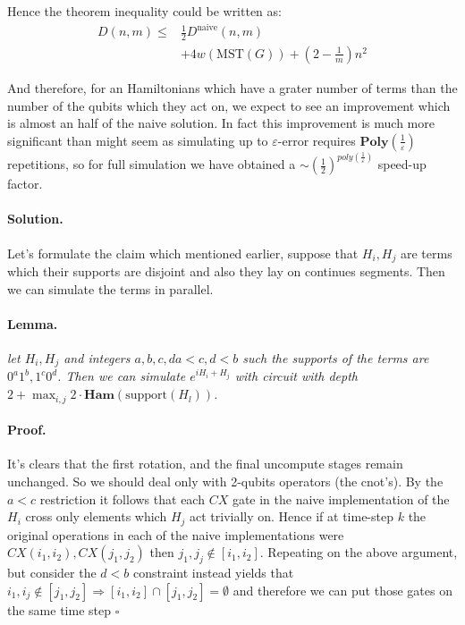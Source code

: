 \documentclass{article}
\begin{document}
\begin{multicols*}{2}
Hence the theorem inequality could be written as:
\begin{equation*}
\begin{split}
    D\left(n,m\right) \leq & \frac{1}{2} D^{\text{naive}} \left(n,m\right) \\ & + 4w \left( \text{MST}\left(G\right) \right) + \left(2 - \frac{1}{m}\right)n^2
\end{split}    
\end{equation*} 

And therefore, for an Hamiltonians which have a grater number of terms than the number of the qubits which they act on, we expect to see an improvement which is almost an half of the naive solution. In fact this improvement is much more significant than might seem as simulating up to \(\varepsilon\)-error requires \(\textbf{Poly} \left( \frac{1}{\varepsilon} \right) \) repetitions, so for full simulation we have obtained a \( \sim (\frac{1}{2})^{poly(\frac{1}{\varepsilon})} \) speed-up factor.     

\paragraph{Solution.} Let's formulate the claim which mentioned earlier, suppose that \(H_{i} ,H_{j}\) are terms which their supports are disjoint and also they lay on continues segments. Then we can simulate the terms in parallel. 
\paragraph{Lemma.} \textit{ let \(H_{i}, H_{j}\) and integers \(a,b,c,d a < c, d < b\) such the supports of the terms are \( 0^{a}1^{b}, 1^{c}0^{d}\). Then we can simulate \(e^{i H_{i} + H_{j}}\) with circuit with depth \( 2 + \max_{ {i,j} } 2 \cdot \textbf{Ham} ( \text{support} ( H_{l} ) )\).}
\paragraph{Proof.} It's clears that the first rotation, and the final uncompute stages remain unchanged. So we should deal only with 2-qubits operators (the cnot's). By the \( a < c \) restriction it follows that each \(CX\) gate in the naive implementation of the \(H_i\) cross only elements which \(H_j\) act trivially on. Hence if at time-step \(k\) the original operations in each of the naive implementations were \( CX(i_{1} , i_{2}), CX(j_{1} , j_{2}) \) then \( j_{1}, j_{j} \notin [i_{1} , i_{2}] \). Repeating on the above argument, but consider the \(d<b\) constraint instead yields that \( i_{1}, i_{j} \notin [j_{1} , j_{2}] \Rightarrow [i_{1},i_{2}]\cap[j_{1},j_{2}] = \emptyset  \) and therefore we can put those gates on the same time step \( \square\)   


\end{multicols*}
\end{document}
